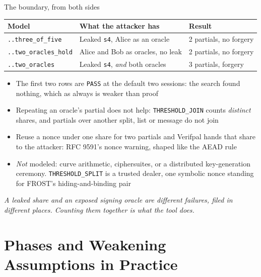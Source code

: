 \ifdefined\PRESENTATION\else\PassOptionsToClass{handout}{beamer}\fi\documentclass[aspectratio=169, lualatex]{beamer}
\begin{document}
\begin{frame}{The boundary, from both sides}
	\begin{center}
		\scriptsize
		\begin{tabular}{|l|l|l|}
			\hline
			\textbf{Model}                 & \textbf{What the attacker has}          & \textbf{Result}         \\
			\hline
			\texttt{..three\_of\_five}      & Leaked \texttt{s4}, Alice as an oracle  & 2 partials, no forgery  \\
			\hline
			\texttt{..two\_oracles\_hold}   & Alice and Bob as oracles, no leak       & 2 partials, no forgery  \\
			\hline
			\texttt{..two\_oracles}         & Leaked \texttt{s4}, \textit{and} both oracles & 3 partials, forgery \\
			\hline
		\end{tabular}
	\end{center}
	\vspace{0.2em}
	\scriptsize
	\begin{itemize}
		\item The first two rows are \texttt{PASS} at the default two sessions: the search found nothing, which as always is weaker than proof
		\item Repeating an oracle's partial does not help: \texttt{THRESHOLD\_JOIN} counts \textit{distinct} shares, and partials over another split, list or message do not join
		\item Reuse a nonce under one share for two partials and Verifpal hands that share to the attacker: RFC 9591's nonce warning, shaped like the AEAD rule
		\item \textit{Not} modeled: curve arithmetic, ciphersuites, or a distributed key-generation ceremony. \texttt{THRESHOLD\_SPLIT} is a trusted dealer, one symbolic nonce standing for FROST's hiding-and-binding pair
	\end{itemize}
	\begin{center}
		\small \textit{A leaked share and an exposed signing oracle are different failures, filed in different places. Counting them together is what the tool does.}
	\end{center}
\end{frame}

\section{Phases and Weakening Assumptions in Practice}
\end{document}
